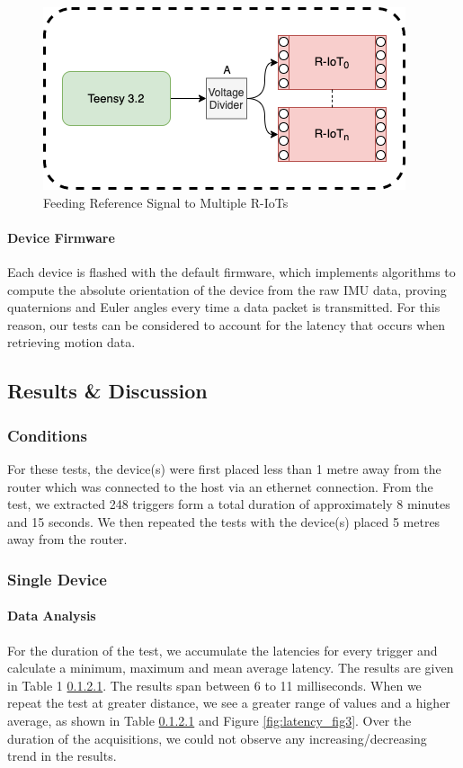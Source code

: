 \begin{figure}[ht]
  \centering
    \includegraphics[width=\textwidth]{Chapters/Figures/technical/Latency/figure2.png}
    \caption{Feeding Reference Signal to Multiple R-IoTs}
    \label{fig:latency_fig2}
\end{figure}

\paragraph{Device Firmware}
Each device is flashed with the default firmware, which implements algorithms to compute the absolute orientation of the device from the raw IMU data, proving quaternions and Euler angles every time a data packet is transmitted. For this reason, our tests can be considered to account for the latency that occurs when retrieving motion data.

\subsection{Results \& Discussion}

\subsubsection{Conditions}
For these tests, the device(s) were first placed less than 1 metre away from the router which was connected to the host via an ethernet connection. From the test, we extracted 248 triggers form a total duration of approximately 8 minutes and 15 seconds. We then repeated the tests with the device(s) placed 5 metres away from the router.

\subsubsection{Single Device}

\paragraph{Data Analysis}
For the duration of the test, we accumulate the latencies for every trigger and calculate a minimum, maximum and mean average latency. The results are given in Table 1 \ref{}. The results span between 6 to 11 milliseconds. When we repeat the test at greater distance, we see a greater range of values and a higher average, as shown in Table \ref{} and Figure \ref{fig:latency_fig3}. Over the duration of the acquisitions, we could not observe any increasing/decreasing trend in the results.

